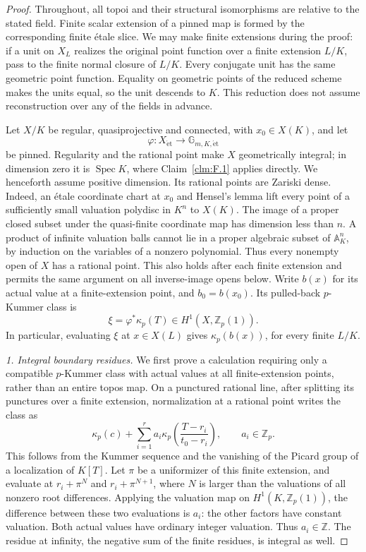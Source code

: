 \documentclass[11pt]{article}
\begin{document}
\begin{proof}
Throughout, all topoi and their structural isomorphisms are
relative to the stated field. Finite scalar extension of a
pinned map is formed by the corresponding finite \'etale
slice. We may make finite extensions during the proof:
if a unit on \(X_L\) realizes the original point function
over a finite extension \(L/K\), pass to the finite normal
closure of \(L/K\). Every conjugate unit has the same
geometric point function. Equality on geometric points of
the reduced scheme makes the units equal, so the unit
descends to \(K\). This reduction does not assume
reconstruction over any of the fields in advance.

Let \(X/K\) be regular, quasiprojective and connected, with
\(x_0\in X(K)\), and let
\[
 \varphi:X_{\mathrm{\acute et}}\longrightarrow
                    \mathbb G_{m,K,\mathrm{\acute et}}
\]
be pinned. Regularity and the rational point make \(X\)
geometrically integral; in dimension zero it is \(\operatorname{Spec}K\),
where Claim~\ref{clm:F.1} applies directly. We henceforth
assume positive dimension. Its rational points are Zariski
 dense. Indeed, an \'etale coordinate chart at \(x_0\)
and Hensel's lemma lift every point of a sufficiently
small valuation polydisc in \(K^n\) to \(X(K)\).
The image of a proper closed subset under the quasi-finite
coordinate map has dimension less than \(n\). A product
of infinite valuation balls cannot lie in a proper
algebraic subset of \(\mathbb A^n_K\), by induction
on the variables of a nonzero polynomial. Thus every
nonempty open of \(X\) has a rational point. This
also holds after each finite extension and permits the
same argument on all inverse-image opens below. Write \(b(x)\) for its actual
value at a finite-extension point, and \(b_0=b(x_0)\).
Its pulled-back \(p\)-Kummer class is
\[
                   \xi=\varphi^*\kappa_p(T)
                          \in H^1(X,\mathbb Z_p(1)).
\]
In particular, evaluating \(\xi\) at \(x\in X(L)\)
gives \(\kappa_p(b(x))\), for every finite \(L/K\).

\emph{1. Integral boundary residues.}
We first prove a calculation requiring only a compatible
\(p\)-Kummer class with actual values at all finite-extension
points, rather than an entire topos map. On a punctured
rational line, after splitting its punctures over a finite
extension, normalization at a rational point writes the
class as
\[
 \kappa_p(c)+\sum_{i=1}^r a_i
       \kappa_p\left(\frac{T-r_i}{t_0-r_i}\right),
                  \qquad a_i\in\mathbb Z_p.             \tag{F.26.1}
\]
This follows from the Kummer sequence and the vanishing of
the Picard group of a localization of \(K[T]\).
Let \(\pi\) be a uniformizer of this finite extension,
and evaluate at \(r_i+\pi^N\) and \(r_i+\pi^{N+1}\),
where \(N\) is larger than the valuations of all nonzero
root differences. Applying the valuation map on
\(H^1(K,\mathbb Z_p(1))\), the difference between these
two evaluations is \(a_i\): the other factors have
constant valuation. Both actual values have ordinary
integer valuation. Thus \(a_i\in\mathbb Z\). The residue
at infinity, the negative sum of the finite residues,
is integral as well.


\end{proof}
\end{document}

